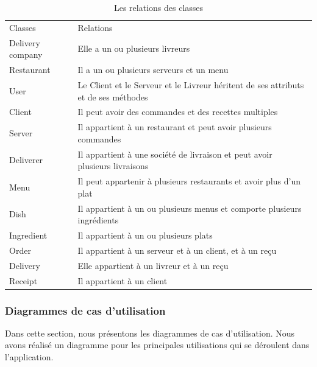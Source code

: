 \documentclass[french, a4paper, 12pt]{report}
\begin{document}
			\begin{table}[!h!]
  				\begin{tabular}{lp{10cm}}
    					Classes & Relations \\
    					Delivery company & Elle a un ou plusieurs livreurs \\
				\hline
				Restaurant  &  Il a un ou plusieurs serveurs et un menu \\
				\hline
				User & Le Client et le Serveur et le Livreur héritent de ses attributs et de ses méthodes \\
				\hline
				Client & Il peut avoir des commandes et des recettes multiples \\
				\hline
				Server & Il appartient à un restaurant et peut avoir plusieurs commandes \\
				\hline
				Deliverer & Il appartient à une société de livraison et peut avoir plusieurs livraisons \\
				\hline
				Menu & Il peut appartenir à plusieurs restaurants et avoir plus d’un plat \\
				\hline
				Dish & Il appartient à un ou plusieurs menus et comporte plusieurs ingrédients \\
				\hline
				Ingredient & Il appartient à un ou plusieurs plats \\
				\hline
				Order & Il appartient à un serveur et à un client, et à un reçu \\
				\hline
				Delivery & Elle appartient à un livreur et à un reçu \\
				\hline
				Receipt & Il appartient à un client \\
  				\end{tabular}
  				\caption{Les relations des classes}
  				\label{tab:classdiag}
			\end{table}

		\newpage
		\subsubsection{Diagrammes de cas d’utilisation} Dans cette section, nous présentons les diagrammes de cas d'utilisation. Nous avons réalisé un diagramme pour les principales utilisations qui se déroulent dans l'application. 
		
			
\end{document}

